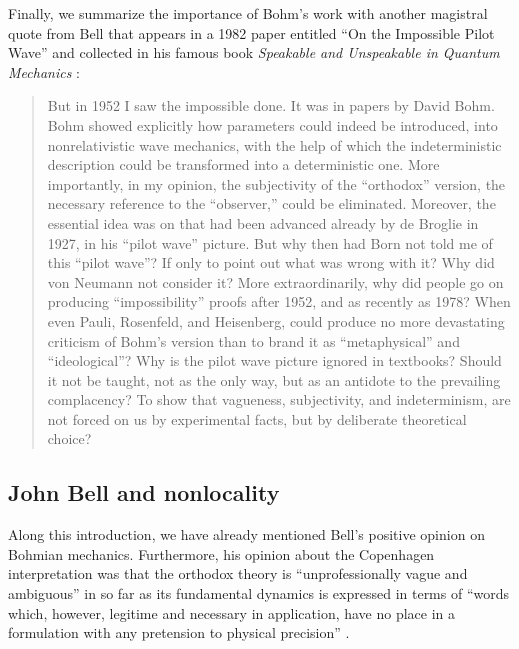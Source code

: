 \documentclass[nofootinbib, secnumarabic, amsmath, nobibnotes,10pt,aps,pra]{revtex4-1}
\begin{document}
Finally, we summarize the importance of Bohm's work with another magistral quote from Bell that appears in a 1982 paper entitled ``On the Impossible Pilot Wave'' and collected in his famous book \textit{Speakable and Unspeakable in Quantum Mechanics} \cite{om.Bell1987}:
\begin{quote}
But in 1952 I saw the impossible done. It was in papers by David Bohm. Bohm showed explicitly how parameters could indeed be introduced, into nonrelativistic wave mechanics, with the help of which the indeterministic description could be transformed into a deterministic one. More importantly, in my opinion, the subjectivity of the ``orthodox'' version, the necessary reference to the ``observer,'' could be eliminated. Moreover, the essential idea was on that had been advanced already by de Broglie in 1927, in his ``pilot wave'' picture. But why then had Born not told me of this ``pilot wave''? If only to point out what was wrong with it? Why did von Neumann not consider it? More extraordinarily, why did people go on producing ``impossibility'' proofs after 1952, and as recently as 1978? When even Pauli, Rosenfeld, and Heisenberg, could produce no more devastating criticism of Bohm's version than to brand it as ``metaphysical'' and ``ideological''? Why is the pilot wave picture ignored in textbooks? Should it not be taught, not as the only way, but as an antidote to the prevailing complacency? To show that vagueness, subjectivity, and indeterminism, are not forced on us by experimental facts, but by deliberate theoretical choice?
\end{quote}

\subsection{John Bell and nonlocality} \label{om.sec_intro.8}

Along this introduction, we have already mentioned Bell's positive opinion on Bohmian mechanics. Furthermore, his opinion about the Copenhagen interpretation was that the orthodox theory is ``unprofessionally vague and ambiguous'' \cite{om.Bell1987,om.bell1990,om.bell1982,om.Bell1964} in so far as its fundamental dynamics is expressed in terms of ``words which, however, legitime and necessary in application, have no place in a formulation with any pretension to physical precision'' \cite{om.bell1990}.
\end{document}

